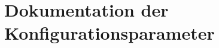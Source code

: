 \documentclass[12pt]{article}
\begin{document}
{%

\section{Dokumentation der Konfigurationsparameter}

\label{sec:documentation_of_config_parameters}
}
\end{document}
